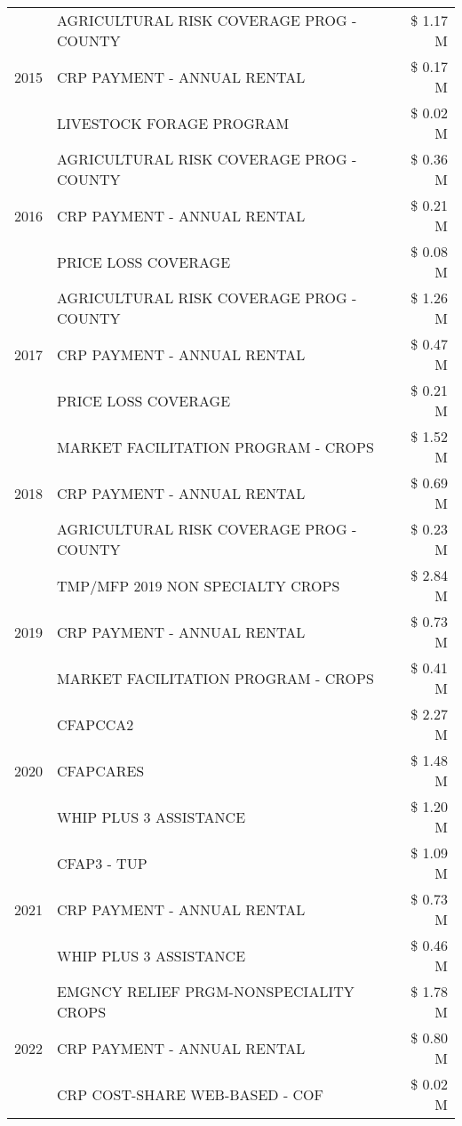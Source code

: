 \begin{tabular}{llr}
\multirow[t]{3}{*}{2015} & AGRICULTURAL RISK COVERAGE PROG - COUNTY & \$ 1.17 M \\
 & CRP PAYMENT - ANNUAL RENTAL & \$ 0.17 M \\
 & LIVESTOCK FORAGE PROGRAM & \$ 0.02 M \\
\cline{1-3}
\multirow[t]{3}{*}{2016} & AGRICULTURAL RISK COVERAGE PROG - COUNTY & \$ 0.36 M \\
 & CRP PAYMENT - ANNUAL RENTAL & \$ 0.21 M \\
 & PRICE LOSS COVERAGE & \$ 0.08 M \\
\cline{1-3}
\multirow[t]{3}{*}{2017} & AGRICULTURAL RISK COVERAGE PROG - COUNTY & \$ 1.26 M \\
 & CRP PAYMENT - ANNUAL RENTAL & \$ 0.47 M \\
 & PRICE LOSS COVERAGE & \$ 0.21 M \\
\cline{1-3}
\multirow[t]{3}{*}{2018} & MARKET FACILITATION PROGRAM - CROPS & \$ 1.52 M \\
 & CRP PAYMENT - ANNUAL RENTAL & \$ 0.69 M \\
 & AGRICULTURAL RISK COVERAGE PROG - COUNTY & \$ 0.23 M \\
\cline{1-3}
\multirow[t]{3}{*}{2019} & TMP/MFP 2019 NON SPECIALTY CROPS & \$ 2.84 M \\
 & CRP PAYMENT - ANNUAL RENTAL & \$ 0.73 M \\
 & MARKET FACILITATION PROGRAM - CROPS & \$ 0.41 M \\
\cline{1-3}
\multirow[t]{3}{*}{2020} & CFAPCCA2 & \$ 2.27 M \\
 & CFAPCARES & \$ 1.48 M \\
 & WHIP PLUS 3 ASSISTANCE & \$ 1.20 M \\
\cline{1-3}
\multirow[t]{3}{*}{2021} & CFAP3 - TUP & \$ 1.09 M \\
 & CRP PAYMENT - ANNUAL RENTAL & \$ 0.73 M \\
 & WHIP PLUS 3 ASSISTANCE & \$ 0.46 M \\
\cline{1-3}
\multirow[t]{3}{*}{2022} & EMGNCY RELIEF PRGM-NONSPECIALITY CROPS & \$ 1.78 M \\
 & CRP PAYMENT - ANNUAL RENTAL & \$ 0.80 M \\
 & CRP COST-SHARE WEB-BASED - COF & \$ 0.02 M \\
\cline{1-3}
\bottomrule
\end{tabular}
